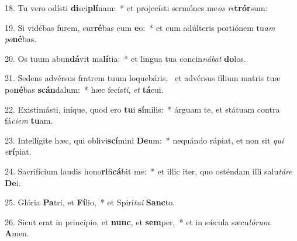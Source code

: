 18. Tu vero odísti \textbf{di}sci\textbf{plí}nam:~*  et projecísti sermónes me\textit{os} \textit{re}\textbf{trór}sum:\

19. Si vidébas furem, cur\textbf{ré}bas cum \textbf{e}o:~*  et cum adúlteris portiónem tu\textit{am} \textit{po}\textbf{né}bas.\

20. Os tuum abun\textbf{dá}vit ma\textbf{lí}tia:~*  et lingua tua concin\textit{ná}\textit{bat} \textbf{do}los.\

21. Sedens advérsus fratrem tuum loquebáris, \dag\  et advérsus fílium matris tuæ po\textbf{né}bas \textbf{scán}dalum:~*  hæc fecís\textit{ti}, \textit{et} \textbf{tá}cui.\

22. Existimásti, iníque, quod ero \textbf{tu}i \textbf{sí}milis:~*  árguam te, et státuam contra fá\textit{ci}\textit{em} \textbf{tu}am.\

23. Intellígite hæc, qui oblivi\textbf{scí}mini \textbf{De}um:~*  nequándo rápiat, et non sit \textit{qui} \textit{e}\textbf{rí}piat.\

24. Sacrifícium laudis hono\textbf{ri}fi\textbf{cá}bit me:~*  et illic iter, quo osténdam illi salu\textit{tá}\textit{re} \textbf{De}i.\

25. Glória \textbf{Pa}tri, et \textbf{Fí}lio,~*  et Spirí\textit{tu}\textit{i} \textbf{Sanc}to.\

26. Sicut erat in princípio, et \textbf{nunc}, et \textbf{sem}per,~*  et in sǽcula sæcu\textit{ló}\textit{rum}. \textbf{A}men.\

